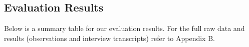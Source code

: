 \documentclass[manuscript, screen, nonacm]{acmart}
\begin{document}
\subsection{Evaluation Results}
Below is a summary table for our evaluation results. For the full raw data and results (observations and interview transcripts) refer to Appendix B.
\end{document}
